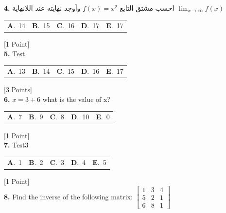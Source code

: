\documentclass[12pt]{article}
\newcommand{\choice}[2]{\textbf{#1}.~#2}
\begin{document}
\noindent \textbf{\textenglish{4.}} {\textarabic{احسب مشتق التابع }}\( f(x) = x^2\){\textarabic{ وأوجد نهايته عند اللانهاية }}\(\lim_{x \to \infty}f(x)\)

\begin{tabularx}{\linewidth}{@{}*{5}{Y}@{}}
\choice{A}{{{\textenglish{14}}}} & \choice{B}{{{\textenglish{15}}}} & \choice{C}{{{\textenglish{16}}}} & \choice{D}{{{\textenglish{17}}}} & \choice{E}{{{\textenglish{17}}}} \\
\end{tabularx}
\hfill {\textenglish{[1 Point]}}\\[0.5em]

\noindent \textbf{\textenglish{5.}} {\textenglish{Test}}

\begin{tabularx}{\linewidth}{@{}*{5}{Y}@{}}
\choice{A}{{{\textenglish{13}}}} & \choice{B}{{{\textenglish{14}}}} & \choice{C}{{{\textenglish{15}}}} & \choice{D}{{{\textenglish{16}}}} & \choice{E}{{{\textenglish{17}}}} \\
\end{tabularx}
\hfill {\textenglish{[3 Points]}}\\[0.5em]

\noindent \textbf{\textenglish{6.}} \(x=3+6 \){\textenglish{ what is the value of x?}}

\begin{tabularx}{\linewidth}{@{}*{5}{Y}@{}}
\choice{A}{{{\textenglish{7}}}} & \choice{B}{{{\textenglish{9}}}} & \choice{C}{{{\textenglish{8}}}} & \choice{D}{{{\textenglish{10}}}} & \choice{E}{{{\textenglish{0}}}} \\
\end{tabularx}
\hfill {\textenglish{[1 Point]}}\\[0.5em]

\noindent \textbf{\textenglish{7.}} {\textenglish{Test3}}

\begin{tabularx}{\linewidth}{@{}*{5}{Y}@{}}
\choice{A}{{{\textenglish{1}}}} & \choice{B}{{{\textenglish{2}}}} & \choice{C}{{{\textenglish{3}}}} & \choice{D}{{{\textenglish{4}}}} & \choice{E}{{{\textenglish{5}}}} \\
\end{tabularx}
\hfill {\textenglish{[1 Point]}}\\[0.5em]

\noindent \textbf{\textenglish{8.}} {\textenglish{Find the inverse of the following matrix: }}\(\begin{bmatrix} 1 & 3 & 4 \\ 5 & 2 & 1 \\ 6 & 8 & 1 \end{bmatrix}\)
\end{document}
